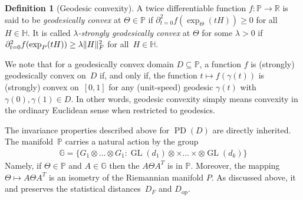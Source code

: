 \documentclass[aos]{imsart}
\theoremstyle{definition}
\newtheorem*{definition}{Definition}
\numberwithin{equation}{section}
\DeclareMathOperator{\op}{op}
\DeclareMathOperator{\GL}{GL}
\DeclareMathOperator{\PD}{PD}
\DeclarePairedDelimiter{\norm}{\lVert}{\rVert}
\newcommand{\R}{{\mathbb{R}}}
\renewcommand{\P}{{\mathbb{P}}}
\renewcommand{\H}{{\mathbb{H}}}
\newcommand{\G}{{\mathbb{G}}}
\newcommand{\ot}{\otimes}
\newcommand{\samp}{x}
\newcommand{\MW}[1]{{\color{red}[MW: #1]}}
\begin{document}
\begin{definition}[Geodesic convexity]
A twice differentiable function $f\colon \P \to \R$ is said to be \emph{geodesically convex} at $\Theta\in\P$ if $\partial^2_{t=0} f(\exp_\Theta(tH)) \geq 0$ for all~$H\in\H$.
It is called \emph{$\lambda$-strongly geodesically convex} at $\Theta$ for some $\lambda>0$ if $\partial^2_{t=0} f(\exp_P(tH)) \geq \lambda \norm H_F^2$ for all~$H\in\H$.

We note that for a geodesically convex domain $D \subseteq \P$, a function $f$ is (strongly) geodesically convex on~$D$ if, and only if, the function $t \mapsto f(\gamma(t))$ is (strongly) convex on~$[0,1]$ for any (unit-speed) geodesic $\gamma(t)$ with $\gamma(0),\gamma(1)\in D$.
In other words, geodesic convexity simply means convexity in the ordinary Euclidean sense when restricted to geodesics.

\end{definition}

The invariance properties described above for $\PD(D)$ are directly inherited.
The manifold~$\P$ carries a natural action by the group
\begin{align*}
  \G =  \{G_1 \ot \dots \ot G_1: \GL(d_1)\ot \times \dots \times \ot \GL(d_k)\}
\end{align*}
Namely, if $\Theta \in \P$ and $A \in \G$ then the $A \Theta A^T$ is in $\P$. Moreover, the mapping $\Theta \mapsto A\Theta A^T$ is an isometry of the Riemannian manifold $P$. As discussed above, it and preserves the statistical distances~$D_F$ and $D_{\op}$.

\end{document}
